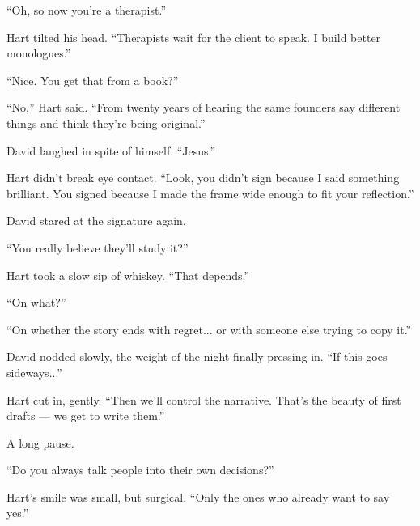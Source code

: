 ``Oh, so now you’re a therapist.''

Hart tilted his head. ``Therapists wait for the client to speak. I build better monologues.''

``Nice. You get that from a book?''

``No,'' Hart said. ``From twenty years of hearing the same founders say different things and think they’re being 
original.''

David laughed in spite of himself. ``Jesus.''

Hart didn’t break eye contact. ``Look, you didn’t sign because I said something brilliant. You signed because 
I made the frame wide enough to fit your reflection.''

David stared at the signature again.

``You really believe they’ll study it?''

Hart took a slow sip of whiskey. ``That depends.''

``On what?''

``On whether the story ends with regret... or with someone else trying to copy it.''

David nodded slowly, the weight of the night finally pressing in. ``If this goes sideways...''

Hart cut in, gently. ``Then we’ll control the narrative. That’s the beauty of first drafts — we get to write them.''

A long pause.

``Do you always talk people into their own decisions?''

Hart’s smile was small, but surgical. ``Only the ones who already want to say yes.''

\medskip

